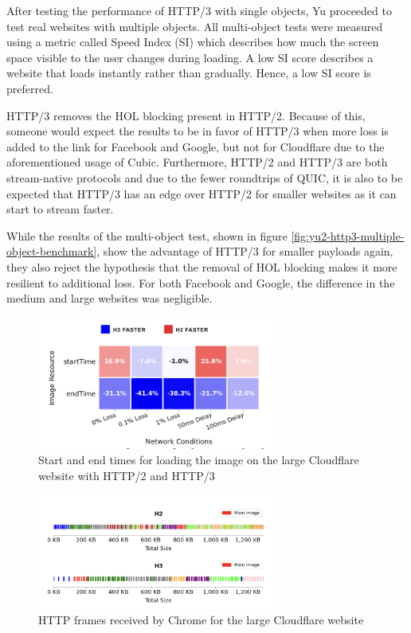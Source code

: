 \documentclass[conference]{IEEEtran}
\begin{document}
After testing the performance of HTTP/3 with single objects, Yu proceeded to test real websites with multiple objects. All multi-object tests were measured using a metric called Speed Index (SI) which describes how much the screen space visible to the user changes during loading. A low SI score describes a website that loads instantly rather than gradually. Hence, a low SI score is preferred.

HTTP/3 removes the HOL blocking present in HTTP/2. Because of this, someone would expect the results to be in favor of HTTP/3 when more loss is added to the link for Facebook and Google, but not for Cloudflare due to the aforementioned usage of Cubic. Furthermore, HTTP/2 and HTTP/3 are both stream-native protocols and due to the fewer roundtrips of QUIC, it is also to be expected that HTTP/3 has an edge over HTTP/2 for smaller websites as it can start to stream faster.

While the results of the multi-object test, shown in figure \ref{fig:yu2-http3-multiple-object-benchmark}, show the advantage of HTTP/3 for smaller payloads again, they also reject the hypothesis that the removal of HOL blocking makes it more resilient to additional loss. For both Facebook and Google, the difference in the medium and large websites was negligible. 

\begin{figure}[htbp]
  \begin{center}
  \includegraphics[width=8cm,keepaspectratio]{images/Yu2/Image load comparison.png}
  \caption{Start and end times for loading the image on the large Cloudflare website with HTTP/2 and HTTP/3}
  \label{fig:yu2-image-load-comparison}
  \end{center}
\end{figure}

\begin{figure}[htbp]
  \begin{center}
  \includegraphics[width=8cm,keepaspectratio]{images/Yu2/Chrome HTTP frames.png}
  \caption{HTTP frames received by Chrome for the large Cloudflare website}
  \label{fig:yu2-chrome-http-frames}
  \end{center}
\end{figure}
\end{document}
